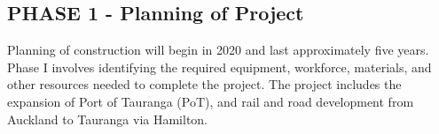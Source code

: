 \newpage
{}
\vspace*{-40mm} %




\subsection*{PHASE 1 - Planning of Project}
Planning of construction will begin in 2020 and last approximately five years. Phase I involves identifying the required equipment, workforce, materials, and other resources needed to complete the project. The project includes the expansion of Port of Tauranga (PoT), and rail and road development from Auckland to Tauranga via Hamilton.

